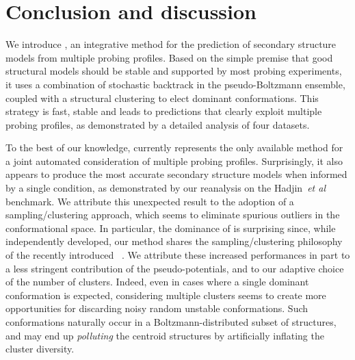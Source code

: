 \documentclass[a4,center,fleqn]{NAR}
\newcommand{\Software}[1]{\text{\ttfamily\bfseries #1}}
\newcommand{\OurTool}{\Software{IPANEMAP}\xspace}
\newcommand{\etal}{~\emph{et al} }
\begin{document}





\section*{Conclusion and discussion}

We introduce \OurTool{}, an integrative method for the prediction of secondary structure models from multiple probing profiles. Based on the simple premise that good structural models should be stable and supported by most probing experiments, it uses a combination of stochastic backtrack in the pseudo-Boltzmann ensemble, coupled with a structural clustering to elect dominant conformations. This strategy is fast, stable and leads to predictions that clearly exploit multiple probing profiles, as demonstrated by a detailed analysis of four datasets. 


To the best of our knowledge, \OurTool currently represents the only available method for a joint automated consideration of multiple probing profiles. Surprisingly, it also appears to produce the most accurate secondary structure models when informed by a single condition, as demonstrated by our reanalysis on the Hadjin\etal\cite{Hajdin2013} benchmark. We attribute this unexpected result to the adoption of a sampling/clustering approach, which seems to eliminate spurious outliers in the conformational space. In particular, the dominance of \OurTool is surprising since, while independently developed, our method shares the sampling/clustering philosophy of the recently introduced \Software{Rsample}~\cite{Spasic2017}. We attribute these increased performances in part to a less stringent contribution of the pseudo-potentials, and to our adaptive choice of the number of clusters. Indeed, even in cases where a single dominant conformation is expected, considering multiple clusters seems to create more opportunities for discarding noisy random unstable conformations. Such conformations naturally occur in a Boltzmann-distributed subset of structures, and may end up \emph{polluting} the centroid structures by artificially inflating the cluster diversity. 
\end{document}
